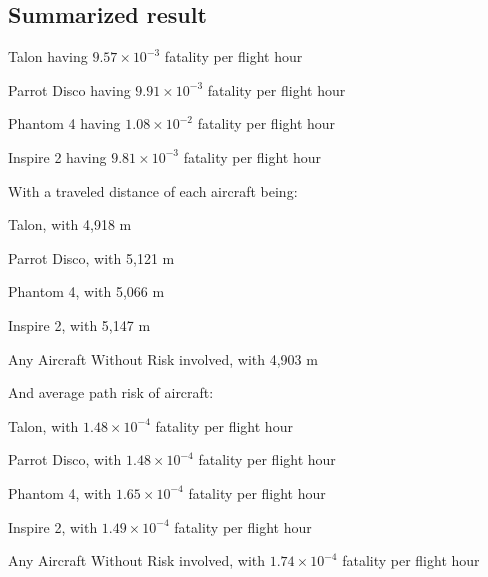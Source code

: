 \documentclass[12pt]{report}
\begin{document}
        \subsection{Summarized result}
            \begin{myitemize}
                \item Talon having $9.57 \times 10^{-3}$ fatality per flight hour
                \item Parrot Disco having $9.91 \times 10^{-3}$ fatality per flight hour
                \item Phantom 4 having $1.08 \times 10^{-2}$ fatality per flight hour
                \item Inspire 2 having $9.81 \times 10^{-3}$ fatality per flight hour
            \end{myitemize}
            With a traveled distance of each aircraft being:
            \begin{myitemize}
                \item Talon, with 4,918 m
                \item Parrot Disco, with 5,121 m
                \item Phantom 4, with 5,066 m
                \item Inspire 2, with 5,147 m
                \item Any Aircraft Without Risk involved, with 4,903 m
            \end{myitemize}
            And average path risk of aircraft:
            \begin{myitemize}
                \item Talon, with $1.48 \times 10^{-4}$ fatality per flight hour
                \item Parrot Disco, with $1.48 \times 10^{-4}$ fatality per flight hour
                \item Phantom 4, with $1.65 \times 10^{-4}$ fatality per flight hour
                \item Inspire 2, with $1.49 \times 10^{-4}$ fatality per flight hour
                \item Any Aircraft Without Risk involved, with $1.74 \times 10^{-4}$ fatality per flight hour
            \end{myitemize}
\end{document}
